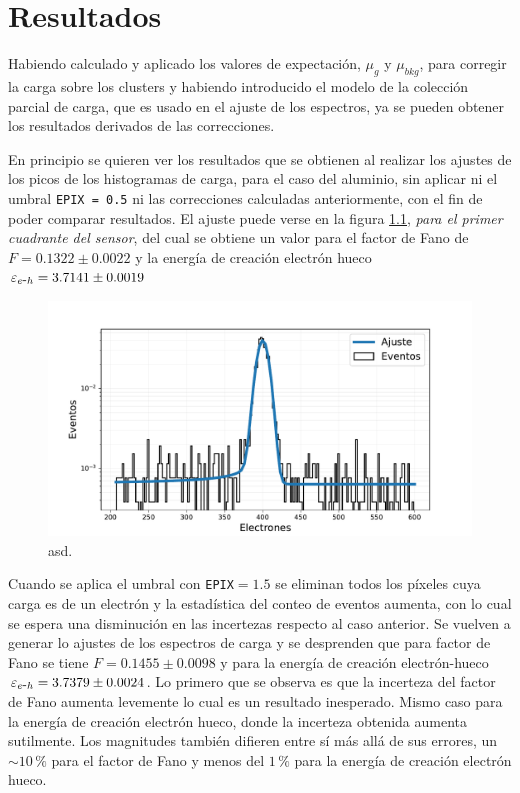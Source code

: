 \chapter{Resultados \label{chap:Resultados}}
\noindent Habiendo calculado y aplicado los valores de expectación, $\mu_{g}$ y $\mu_{bkg}$, para corregir la carga sobre los clusters y habiendo introducido el modelo de la colección parcial de carga, que es usado en el ajuste de los espectros, ya se pueden obtener los resultados derivados de las correcciones.

En principio se quieren ver los resultados que se obtienen al realizar los ajustes de los picos de los histogramas de carga, para el caso del aluminio, sin aplicar ni el umbral \verb|EPIX = 0.5| ni las correcciones calculadas anteriormente, con el fin de poder comparar resultados. El ajuste puede verse en la figura \ref{fig:Al_OHDU1_EPIX05}, \textit{para el primer cuadrante del sensor}, del cual se obtiene un valor para el factor de Fano de $F = 0.1322 \pm 0.0022$ y la energía de creación electrón hueco $\varepsilon_{e\mbox{-}h} = 3.7141 \pm 0.0019$
\begin{figure}[H]
    \centering
        \includegraphics[scale=0.5]{Figs/HistFit_EPIX05_OHDU1_SinCorr.pdf}
    \caption{\footnotesize{asd.}}
    \label{fig:Al_OHDU1_EPIX05}
\end{figure}
Cuando se aplica el umbral con \verb|EPIX|$=1.5$ se eliminan todos los píxeles cuya carga es de un electrón y la estadística del conteo de eventos aumenta, con lo cual se espera una disminución en las incertezas respecto al caso anterior. Se vuelven a generar lo ajustes de los espectros de carga y se desprenden que para factor de Fano se tiene $F = 0.1455 \pm 0.0098$ y para la energía de creación electrón-hueco $\varepsilon_{e\mbox{-}h} = 3.7379 \pm 0.0024$. Lo primero que se observa es que la incerteza del factor de Fano aumenta levemente lo cual es un resultado inesperado. Mismo caso para la energía de creación electrón hueco, donde la incerteza obtenida aumenta sutilmente. Los magnitudes también difieren entre sí más allá de sus errores, un $\sim 10\,\%$ para el factor de Fano y menos del $1\,\%$ para la energía de creación electrón hueco.

